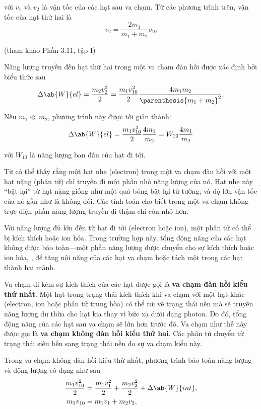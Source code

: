 \noindent
với $v_1$ và $v_2$ là vận tốc của các hạt sau va chạm.
Từ các phương trình trên, vận tốc của hạt thứ hai là
\begin{equation*}
    v_2 = \frac{2 m_1}{m_1 + m_2} v_{10}
\end{equation*}

\noindent
(tham khảo Phần 3.11, tập I)

Năng lượng truyền đến hạt thứ hai trong một va chạm đàn hồi được xác định bởi biểu thức sau
\begin{equation*}
    \Delta{\ab{W}{el}} = \frac{m_2v_2^2}{2} = \frac{m_1v_{10}^2}{2} \frac{4 m_1 m_2}{\parenthesis{m_1 + m_2}^2}.
\end{equation*}

\noindent
Nếu $m_1\ll m_2$, phương trình này được tối giản thành:
\begin{equation}\label{eq:12_12}
    \Delta{\ab{W}{el}} = \frac{m_1v_{10}^2}{2} \frac{4 m_1}{m_2} = W_{10}\frac{4 m_1}{m_2}
\end{equation}

\noindent
với $W_{10}$ là năng lượng ban đầu của hạt đi tới.

Từ  có thể thấy rằng một hạt nhẹ (electron) trong một va chạm đàn hồi với một hạt nặng (phân tử) chỉ truyền đi một phần nhỏ năng lượng của nó.
Hạt nhẹ này ``bật lại'' từ hạt nặng giống như một quả bóng bật lại từ tường, và độ lớn vận tốc của nó gần như là không đổi.
Các tính toán cho biết trong một va chạm không trực diện phần năng lượng truyền đi thậm chí còn nhỏ hơn.

Với năng lượng đủ lớn đến từ hạt đi tới (electron hoặc ion), một phân tử có thể bị kích thích hoặc ion hóa.
Trong trường hợp này, tổng động năng của các hạt không được bảo toàn---một phần năng lượng được chuyển cho sự kích thích hoặc ion hóa, \ie, để tăng nội năng của các hạt va chạm hoặc tách một trong các hạt thành hai mảnh.

Va chạm đi kèm sự kích thích của các hạt được gọi là \textbf{va chạm đàn hồi kiểu thứ nhất}.
Một hạt trong trạng thái kích thích khi va chạm với một hạt khác (electron, ion hoặc phân tử trung hòa) có thể rơi về trạng thái nền mà sẽ truyền năng lượng dư thừa cho hạt kia thay vì bức xạ dưới dạng photon.
Do đó, tổng động năng của các hạt sau va chạm sẽ lớn hơn trước đó.
Va chạm như thế này được gọi là \textbf{va chạm không đàn hồi kiểu thứ hai}.
Các phân tử chuyển từ trạng thái siêu bền sang trạng thái nền do sự va chạm kiểu này.

Trong va chạm không đàn hồi kiểu thứ nhất, phương trình bảo toàn năng lượng và động lượng có dạng như sau
\begin{align}
    \frac{m_1 v_{10}^2}{2} &= \frac{m_1 v_1^2}{2} + \frac{m_2 v_2^2}{2} + \Delta{\ab{W}{int}}, \label{eq:12_13}\\
    m_1 v_{10} &= m_1 v_1 + m_2 v_2,
\end{align}

